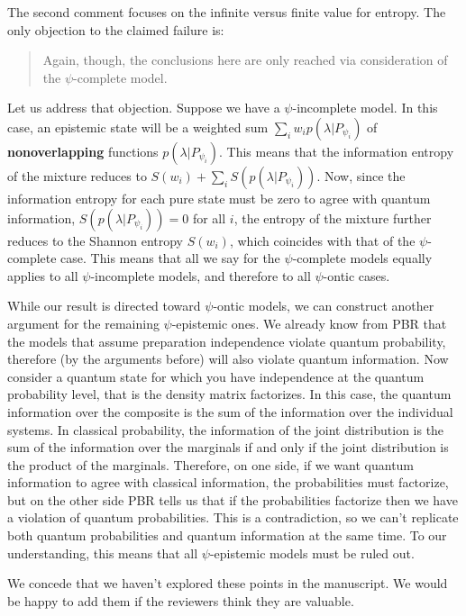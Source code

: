 \documentclass[11pt]{article}
\begin{document}
The second comment focuses on the infinite versus finite value for entropy. The only objection to the claimed failure is:
\begin{quote}
Again, though, the conclusions here are only reached via consideration of the $\psi$-complete model.
\end{quote}
Let us address that objection. Suppose we have a $\psi$-incomplete model. In this case, an epistemic state will be a weighted sum $\sum_i  w_i p(\lambda| P_{\psi_i})$ of \textbf{nonoverlapping} functions $p(\lambda| P_{\psi_i})$. This means that the information entropy of the mixture reduces to $S(w_i) + \sum_i S(p(\lambda| P_{\psi_i}))$. Now, since the information entropy for each pure state must be zero to agree with quantum information, $S(p(\lambda| P_{\psi_i}))=0$ for all $i$, the entropy of the mixture further reduces to the Shannon entropy $S(w_i)$, which coincides with that of the $\psi$-complete case. This means that all we say for the $\psi$-complete models equally applies to all $\psi$-incomplete models, and therefore to all $\psi$-ontic cases.

While our result is directed toward $\psi$-ontic models, we can construct another argument for the remaining $\psi$-epistemic ones. We already know from PBR that the models that assume preparation independence violate quantum probability, therefore (by the arguments before) will also violate quantum information. Now consider a quantum state for which you have independence at the quantum probability level, that is the density matrix factorizes. In this case, the quantum information over the composite is the sum of the information over the individual systems. In classical probability, the information of the joint distribution is the sum of the information over the marginals if and only if the joint distribution is the product of the marginals. Therefore, on one side, if we want quantum information to agree with classical information, the probabilities must factorize, but on the other side PBR tells us that if the probabilities factorize then we have a violation of quantum probabilities. This is a contradiction, so we can't replicate both quantum probabilities and quantum information at the same time. To our understanding, this means that all $\psi$-epistemic models must be ruled out.

We concede that we haven't explored these points in the manuscript. We would be happy to add them if the reviewers think they are valuable.
\end{document}
